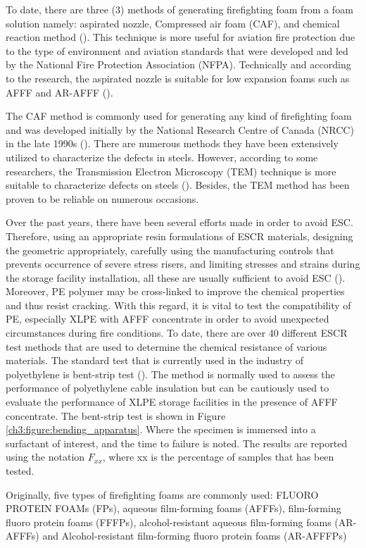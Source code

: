 To date, there are three (3) methods of generating firefighting foam from a foam solution namely: aspirated nozzle, Compressed air foam (CAF), and chemical reaction method (\cite{laundess2012suppression}). This technique is more useful for aviation fire protection due to the type of environment and aviation standards that were developed and led by the National Fire Protection Association (NFPA). Technically and according to the research, the aspirated nozzle is suitable for low expansion foams such as AFFF and AR-AFFF (\cite{xi2017experimental}).

The CAF method is commonly used for generating any kind of firefighting foam and was developed initially by the National Research Centre of Canada (NRCC) in the late 1990s (\cite{rie2016class}). There are numerous methods they have been extensively utilized to characterize the defects in steels. However, according to some researchers, the Transmission Electron Microscopy (TEM) technique is more suitable to characterize defects on steels (\cite{george2002introduction, bhadeshia2017steels}). Besides, the TEM method has been proven to be reliable on numerous occasions.

Over the past years, there have been several efforts made in order to avoid ESC. Therefore, using an appropriate resin formulations of ESCR materials, designing the geometric appropriately, carefully using the manufacturing controls that prevents occurrence of severe stress risers, and limiting stresses and strains during the storage facility installation, all these are usually sufficient to avoid ESC (\cite{gabriel1998history}). Moreover, PE polymer may be cross-linked to improve the chemical properties and thus resist cracking.  With this regard, it is vital to test the compatibility of PE, especially XLPE with AFFF concentrate in order to avoid unexpected circumstances during fire conditions. To date, there are over 40 different ESCR test methods that are used to determine the chemical resistance of various materials. The standard test that is currently used in the industry of polyethylene is bent-strip test (\cite{gabriel1998history}). The method is normally used to assess the performance of polyethylene cable insulation but can be cautiously used to evaluate the performance of XLPE storage facilities in the presence of AFFF concentrate. The bent-strip test is shown in Figure \ref{ch3:figure:bending_apparatus}. Where the specimen is immersed into a surfactant of interest, and the time to failure is noted. The results are reported using the notation $F_{xx}$, where xx is the percentage of samples that has been tested.

Originally, five types of firefighting foams are commonly used: FLUORO PROTEIN FOAMs (FPs), aqueous film-forming foams (AFFFs), film-forming fluoro protein foams (FFFPs), alcohol-resistant aqueous film-forming foams (AR-AFFFs) and Alcohol-resistant film-forming fluoro protein foams (AR-AFFFPs)
